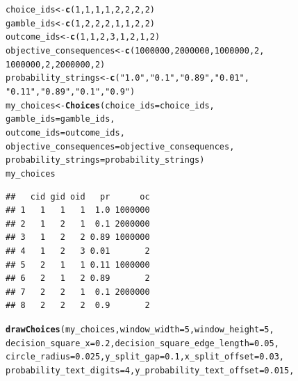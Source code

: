 \documentclass{article}\usepackage[]{graphicx}\usepackage[]{color}
\makeatletter
\newcommand{\hlnum}[1]{\textcolor[rgb]{0.686,0.059,0.569}{#1}}%
\newcommand{\hlstr}[1]{\textcolor[rgb]{0.192,0.494,0.8}{#1}}%
\newcommand{\hlstd}[1]{\textcolor[rgb]{0.345,0.345,0.345}{#1}}%
\newcommand{\hlkwb}[1]{\textcolor[rgb]{0.69,0.353,0.396}{#1}}%
\newcommand{\hlkwc}[1]{\textcolor[rgb]{0.333,0.667,0.333}{#1}}%
\newcommand{\hlkwd}[1]{\textcolor[rgb]{0.737,0.353,0.396}{\textbf{#1}}}%
\newenvironment{kframe}{%
 \def\at@end@of@kframe{}%
 \ifinner\ifhmode%
  \def\at@end@of@kframe{\end{minipage}}%
  \begin{minipage}{\columnwidth}%
 \fi\fi%
 \def\FrameCommand##1{\hskip\@totalleftmargin \hskip-\fboxsep
 \colorbox{shadecolor}{##1}\hskip-\fboxsep
     \hskip-\linewidth \hskip-\@totalleftmargin \hskip\columnwidth}%
 \MakeFramed {\advance\hsize-\width
   \@totalleftmargin\z@ \linewidth\hsize
   \@setminipage}}%
 {\par\unskip\endMakeFramed%
 \at@end@of@kframe}
\newenvironment{knitrout}{}{} %
\makeatother
\begin{document}
\begin{knitrout}
\color{fgcolor}\begin{kframe}
\begin{alltt}
\hlstd{choice_ids} \hlkwb{<-} \hlkwd{c}\hlstd{(}\hlnum{1}\hlstd{,} \hlnum{1}\hlstd{,} \hlnum{1}\hlstd{,} \hlnum{1}\hlstd{,} \hlnum{2}\hlstd{,} \hlnum{2}\hlstd{,} \hlnum{2}\hlstd{,} \hlnum{2}\hlstd{)}
\hlstd{gamble_ids} \hlkwb{<-} \hlkwd{c}\hlstd{(}\hlnum{1}\hlstd{,} \hlnum{2}\hlstd{,} \hlnum{2}\hlstd{,} \hlnum{2}\hlstd{,} \hlnum{1}\hlstd{,} \hlnum{1}\hlstd{,} \hlnum{2}\hlstd{,} \hlnum{2}\hlstd{)}
\hlstd{outcome_ids} \hlkwb{<-} \hlkwd{c}\hlstd{(}\hlnum{1}\hlstd{,} \hlnum{1}\hlstd{,} \hlnum{2}\hlstd{,} \hlnum{3}\hlstd{,} \hlnum{1}\hlstd{,} \hlnum{2}\hlstd{,} \hlnum{1}\hlstd{,} \hlnum{2}\hlstd{)}
\hlstd{objective_consequences} \hlkwb{<-} \hlkwd{c}\hlstd{(}\hlnum{1000000}\hlstd{,} \hlnum{2000000}\hlstd{,} \hlnum{1000000}\hlstd{,} \hlnum{2}\hlstd{,}
        \hlnum{1000000}\hlstd{,} \hlnum{2}\hlstd{,} \hlnum{2000000}\hlstd{,} \hlnum{2}\hlstd{)}
\hlstd{probability_strings} \hlkwb{<-} \hlkwd{c}\hlstd{(}\hlstr{"1.0"}\hlstd{,} \hlstr{"0.1"}\hlstd{,} \hlstr{"0.89"}\hlstd{,} \hlstr{"0.01"}\hlstd{,}
        \hlstr{"0.11"}\hlstd{,} \hlstr{"0.89"}\hlstd{,} \hlstr{"0.1"}\hlstd{,} \hlstr{"0.9"}\hlstd{)}
\hlstd{my_choices} \hlkwb{<-} \hlkwd{Choices}\hlstd{(}\hlkwc{choice_ids}\hlstd{=choice_ids,}
        \hlkwc{gamble_ids}\hlstd{=gamble_ids,}
        \hlkwc{outcome_ids}\hlstd{=outcome_ids,}
        \hlkwc{objective_consequences}\hlstd{=objective_consequences,}
        \hlkwc{probability_strings}\hlstd{=probability_strings)}
\hlstd{my_choices}
\end{alltt}
\begin{verbatim}
##   cid gid oid   pr      oc
## 1   1   1   1  1.0 1000000
## 2   1   2   1  0.1 2000000
## 3   1   2   2 0.89 1000000
## 4   1   2   3 0.01       2
## 5   2   1   1 0.11 1000000
## 6   2   1   2 0.89       2
## 7   2   2   1  0.1 2000000
## 8   2   2   2  0.9       2
\end{verbatim}
\begin{alltt}
\hlkwd{drawChoices}\hlstd{(my_choices,} \hlkwc{window_width}\hlstd{=}\hlnum{5}\hlstd{,} \hlkwc{window_height}\hlstd{=}\hlnum{5}\hlstd{,}
        \hlkwc{decision_square_x}\hlstd{=}\hlnum{0.2}\hlstd{,} \hlkwc{decision_square_edge_length}\hlstd{=}\hlnum{0.05}\hlstd{,}
        \hlkwc{circle_radius}\hlstd{=}\hlnum{0.025}\hlstd{,} \hlkwc{y_split_gap}\hlstd{=}\hlnum{0.1}\hlstd{,} \hlkwc{x_split_offset}\hlstd{=}\hlnum{0.03}\hlstd{,}
        \hlkwc{probability_text_digits}\hlstd{=}\hlnum{4}\hlstd{,} \hlkwc{y_probability_text_offset}\hlstd{=}\hlnum{0.015}\hlstd{,}

\end{alltt}
\end{kframe}
\end{knitrout}
\end{document}
